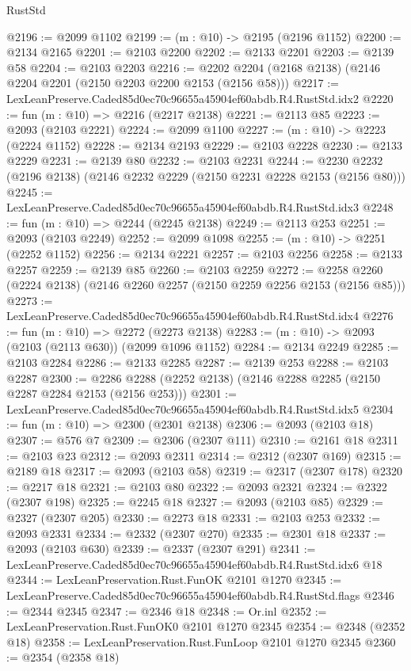 \begin{lexlean}{RustStd}
\begin{coremodule}
@2196 := @2099 @1102
@2199 := (m : @10) -> @2195 (@2196 @1152)
@2200 := @2134 @2165
@2201 := @2103 @2200
@2202 := @2133 @2201
@2203 := @2139 @58
@2204 := @2103 @2203
@2216 := @2202 @2204 (@2168 @2138) (@2146 @2204 @2201 (@2150 @2203 @2200 @2153 (@2156 @58)))
@2217 := LexLeanPreserve.Caded85d0ec70c96655a45904ef60abdb.R4.RustStd.idx2
@2220 := fun (m : @10) => @2216 (@2217 @2138)
@2221 := @2113 @85
@2223 := @2093 (@2103 @2221)
@2224 := @2099 @1100
@2227 := (m : @10) -> @2223 (@2224 @1152)
@2228 := @2134 @2193
@2229 := @2103 @2228
@2230 := @2133 @2229
@2231 := @2139 @80
@2232 := @2103 @2231
@2244 := @2230 @2232 (@2196 @2138) (@2146 @2232 @2229 (@2150 @2231 @2228 @2153 (@2156 @80)))
@2245 := LexLeanPreserve.Caded85d0ec70c96655a45904ef60abdb.R4.RustStd.idx3
@2248 := fun (m : @10) => @2244 (@2245 @2138)
@2249 := @2113 @253
@2251 := @2093 (@2103 @2249)
@2252 := @2099 @1098
@2255 := (m : @10) -> @2251 (@2252 @1152)
@2256 := @2134 @2221
@2257 := @2103 @2256
@2258 := @2133 @2257
@2259 := @2139 @85
@2260 := @2103 @2259
@2272 := @2258 @2260 (@2224 @2138) (@2146 @2260 @2257 (@2150 @2259 @2256 @2153 (@2156 @85)))
@2273 := LexLeanPreserve.Caded85d0ec70c96655a45904ef60abdb.R4.RustStd.idx4
@2276 := fun (m : @10) => @2272 (@2273 @2138)
@2283 := (m : @10) -> @2093 (@2103 (@2113 @630)) (@2099 @1096 @1152)
@2284 := @2134 @2249
@2285 := @2103 @2284
@2286 := @2133 @2285
@2287 := @2139 @253
@2288 := @2103 @2287
@2300 := @2286 @2288 (@2252 @2138) (@2146 @2288 @2285 (@2150 @2287 @2284 @2153 (@2156 @253)))
@2301 := LexLeanPreserve.Caded85d0ec70c96655a45904ef60abdb.R4.RustStd.idx5
@2304 := fun (m : @10) => @2300 (@2301 @2138)
@2306 := @2093 (@2103 @18)
@2307 := @576 @7
@2309 := @2306 (@2307 @111)
@2310 := @2161 @18
@2311 := @2103 @23
@2312 := @2093 @2311
@2314 := @2312 (@2307 @169)
@2315 := @2189 @18
@2317 := @2093 (@2103 @58)
@2319 := @2317 (@2307 @178)
@2320 := @2217 @18
@2321 := @2103 @80
@2322 := @2093 @2321
@2324 := @2322 (@2307 @198)
@2325 := @2245 @18
@2327 := @2093 (@2103 @85)
@2329 := @2327 (@2307 @205)
@2330 := @2273 @18
@2331 := @2103 @253
@2332 := @2093 @2331
@2334 := @2332 (@2307 @270)
@2335 := @2301 @18
@2337 := @2093 (@2103 @630)
@2339 := @2337 (@2307 @291)
@2341 := LexLeanPreserve.Caded85d0ec70c96655a45904ef60abdb.R4.RustStd.idx6 @18
@2344 := LexLeanPreservation.Rust.FunOK @2101 @1270
@2345 := LexLeanPreserve.Caded85d0ec70c96655a45904ef60abdb.R4.RustStd.flags
@2346 := @2344 @2345
@2347 := @2346 @18
@2348 := Or.inl
@2352 := LexLeanPreservation.Rust.FunOK0 @2101 @1270 @2345
@2354 := @2348 (@2352 @18)
@2358 := LexLeanPreservation.Rust.FunLoop @2101 @1270 @2345
@2360 := @2354 (@2358 @18)

\end{coremodule}
\end{lexlean}
